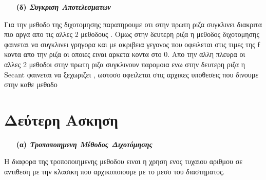 \documentclass[a4paper,11pt]{article}
\begin{document}
	\begin{enumerate}
		\item[\textbf{(δ)}] \emph {\textbf{Συγκριση Αποτελεσματων}}
	\end{enumerate}
	\begin{enumerate}
		\item[\text{1.}]  {
		\begin{enumerate}
			\item[\text{(a)}]{}
			\item[\text{(b)}]{}
		\end{enumerate}
		}
		\item[\text{2.}]  {
			\begin{enumerate}
				\item[\text{(a)}]{}
				\item[\text{(b)}]{}
			\end{enumerate}
		}
		\item[\text{3.}]  {
			\begin{enumerate}
				\item[\text{(a)}]{}
				\item[\text{(b)}]{}
			\end{enumerate}
		}
		
	\end{enumerate}
	\begin{center}
		Για την μεθοδο της διχοτομησης παρατηρουμε οτι στην πρωτη ριζα συγκλινει διακριτα πιο αργα απο τις αλλες 2 μεθοδους . Ομως στην δευτερη ριζα η μεθοδος διχοτομησης φαινεται να συγκλινει γρηγορα και με ακριβεια γεγονος που οφειλεται στις τιμες της f κοντα απο την ριζα οι οποιες ειναι αρκετα κοντα στο 0. Απο την αλλη πλευρα οι αλλες 2 μεθοδοι στην πρωτη ριζα συγκλινουν παρομοια ενω στην δευτερη ριζα η Secant φαινεται να ξεχωριζει , ωστοσο οφειλεται στις αρχικες υποθεσεις που δινουμε στην καθε μεθοδο
	\end{center}
	
	\section{Δεύτερη Ασκηση}
	
	\begin{enumerate}
		\item[\textbf{(α)}] \emph {\textbf{Τροποποιημενη Μέθοδος Διχοτόμησης}}
	\end{enumerate}
	\begin{center}
		Η διαφορα της τροποποιημενης μεθοδου ειναι η χρηση ενος τυχαιου αριθμου σε αντιθεση με την κλασικη που αρχικοποιουμε με το μεσο του διαστηματος.
	\end{center}
	
\end{document}
